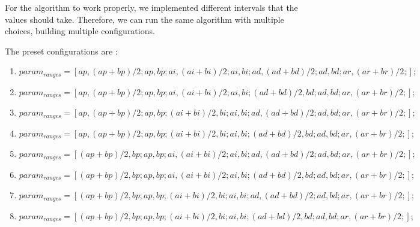 \documentclass[english]{article}
\begin{document}
    For the algorithm to work properly, we implemented different intervals that the values should take. Therefore, we can run the same algorithm with multiple choices, building multiple configurations.

    The preset configurations are :
    \begin{enumerate}
        \item $param_{ranges} = [
    ap, (ap+bp)/2;  %
    ap, bp;  %
    ai, (ai+bi)/2;  %
    ai, bi;  %
    ad, (ad+bd)/2; %
    ad, bd; %
    ar,(ar+br)/2 ;%
];$
        \item $param_{ranges} = [
    ap, (ap+bp)/2;  %
    ap, bp;  %
    ai, (ai+bi)/2;  %
    ai, bi;  %
    (ad+bd)/2, bd; %
    ad, bd; %
    ar,(ar+br)/2 ;%
];$

\item 
    $param_{ranges} = [
    ap, (ap+bp)/2;  %
    ap, bp;  %
    (ai+bi)/2, bi;  %
    ai, bi;  %
    ad, (ad+bd)/2; %
    ad, bd; %
    ar,(ar+br)/2 ;%
];$

\item $param_{ranges} = [
    ap, (ap+bp)/2;  %
    ap, bp;  %
    (ai+bi)/2, bi;  %
    ai, bi;  %
    (ad+bd)/2, bd; %
    ad, bd; %
    ar,(ar+br)/2 ;%
];$

\item $param_{ranges} = [
    (ap+bp)/2, bp;  %
    ap, bp;  %
    ai, (ai+bi)/2;  %
    ai, bi;  %
    ad, (ad+bd)/2; %
    ad, bd; %
    ar,(ar+br)/2 ;%
];$

\item $param_{ranges} = [
   (ap+bp)/2, bp;  %
    ap, bp;  %
    ai, (ai+bi)/2;  %
    ai, bi;  %
    (ad+bd)/2, bd; %
    ad, bd; %
    ar,(ar+br)/2 ;%
];$

\item $param_{ranges} = [
    (ap+bp)/2, bp;  %
    ap, bp;  %
    (ai+bi)/2, bi;  %
    ai, bi;  %
    ad, (ad+bd)/2; %
    ad, bd; %
    ar,(ar+br)/2 ;%
];$

\item $param_{ranges} = [
    (ap+bp)/2, bp;  %
    ap, bp;  %
    (ai+bi)/2, bi;  %
    ai, bi;  %
    (ad+bd)/2, bd; %
    ad, bd; %
    ar,(ar+br)/2 ;%
];$
    \end{enumerate}
\end{document}
